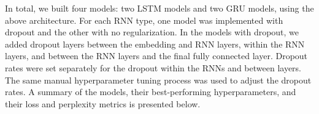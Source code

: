 \documentclass{article}
\begin{document}
In total, we built four models: two LSTM models and two GRU models, using the above architecture. For each RNN type, one model was implemented with dropout and the other with no regularization. In the models with dropout, we added dropout layers between the embedding and RNN layers, within the RNN layers, and between the RNN layers and the final fully connected layer. Dropout rates were set separately for the dropout within the RNNs and between layers. The same manual hyperparameter tuning process was used to adjust the dropout rates. A summary of the models, their best-performing hyperparameters, and their loss and perplexity metrics is presented below.


\begin{table}[ht]
    \centering
    
\end{table}
\end{document}

